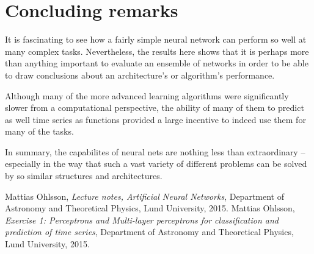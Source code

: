 \documentclass[a4paper,12pt]{article}
\theoremstyle{plain}
\theoremstyle{definition}
\begin{document}
   \section{Concluding remarks}
     It is fascinating to see how a fairly simple neural network can perform so
     well at many complex tasks. Nevertheless, the results here shows that it is
     perhaps more than anything important to evaluate an ensemble of networks in
     order to be able to draw conclusions about an architecture's or algorithm's
     performance. 

     Although many of the more advanced learning algorithms were significantly
     slower from a computational perspective, the ability of many of them to
     predict as well time series as functions provided a large incentive to
     indeed use them for many of the tasks.  

     In summary, the capabilites of neural nets are nothing less than
     extraordinary -- especially in the way that such a vast variety of 
     different problems can be solved by so similar structures and architectures. 

   \begin{thebibliography}{99}
     Mattias Ohlsson,
     \emph{Lecture notes, Artificial Neural Networks},
     Department of Astronomy and Theoretical Physics,
     Lund University,
     2015.
     Mattias Ohlsson,
     \emph{Exercise 1: Perceptrons and Multi-layer perceptrons for
     classification and prediction of time series},
     Department of Astronomy and Theoretical Physics,
     Lund University,
     2015.
\end{thebibliography}
\end{document}
